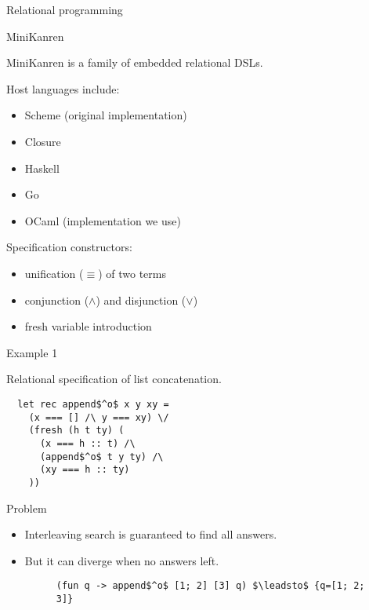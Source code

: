 \documentclass[final]{beamer}
\newlength{\onecolwid}
\begin{document}
\begin{frame}[fragile]
\begin{columns}[t]
\begin{column}{\onecolwid}
\begin{block}{Relational programming}
\begin{itemize}
\end{itemize}

\end{block}


\begin{block}{MiniKanren}

MiniKanren is a family of embedded relational DSLs.

Host languages include:

\begin{itemize}
  \item Scheme (original implementation)
  \item Closure
  \item Haskell
  \item Go
  \item OCaml (implementation we use)
\end{itemize}

Specification constructors:
\begin{itemize}
  \item unification ($\equiv$) of two terms
  \item conjunction ($\wedge$) and disjunction ($\vee$)
  \item fresh variable introduction
\end{itemize}

\begin{alertblock}{Example 1}

Relational specification of list concatenation.

\begin{lstlisting}
  let rec append$^o$ x y xy =
    (x === [] /\ y === xy) \/
    (fresh (h t ty) (
      (x === h :: t) /\
      (append$^o$ t y ty) /\
      (xy === h :: ty)
    ))
\end{lstlisting}

\end{alertblock}

\end{block}


\begin{block}{Problem}

\begin{itemize}
    \item[\smiley] Interleaving search is guaranteed to find all answers. 
    \item[\frownie] But it can diverge when no answers left.

\begin{figure}
\begin{lstlisting}
(fun q -> append$^o$ [1; 2] [3] q) $\leadsto$ {q=[1; 2; 3]}


\end{lstlisting}
\end{figure}
\end{itemize}
\end{block}
\end{column}
\end{columns}
\end{frame}
\end{document}
